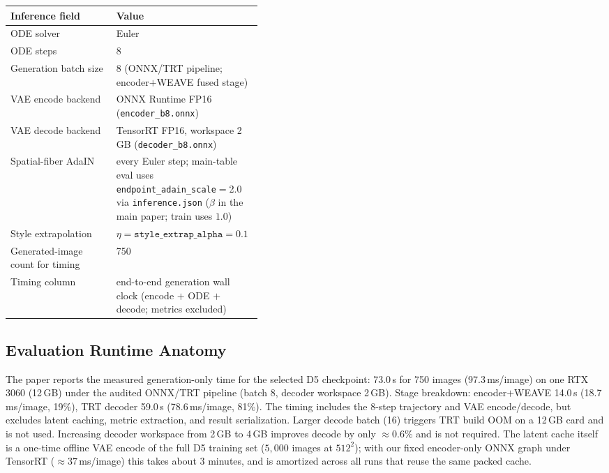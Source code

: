 \documentclass[letterpaper]{article}
\begin{document}
\begin{center}
\footnotesize
\begin{tabularx}{\linewidth}{p{0.42\linewidth}X}
\toprule
Inference field & Value \\
\midrule
ODE solver & Euler \\
ODE steps & 8 \\
Generation batch size & 8 (ONNX/TRT pipeline; encoder$+$WEAVE fused stage) \\
VAE encode backend & ONNX Runtime FP16 (\texttt{encoder\_b8.onnx}) \\
VAE decode backend & TensorRT FP16, workspace 2\,GB (\texttt{decoder\_b8.onnx}) \\
Spatial-fiber AdaIN & every Euler step; main-table eval uses \texttt{endpoint\_adain\_scale}${}={}$2.0 via \texttt{inference.json} ($\beta$ in the main paper; train uses $1.0$) \\
Style extrapolation & $\eta=\texttt{style\_extrap\_alpha}=0.1$ \\
Generated-image count for timing & 750 \\
Timing column & end-to-end generation wall clock (encode $+$ ODE $+$ decode; metrics excluded) \\
\bottomrule
\end{tabularx}
\normalsize
\end{center}

\subsection{Evaluation Runtime Anatomy}

The paper reports the measured generation-only time for the selected D5 checkpoint:
73.0\,s for 750 images (97.3\,ms/image) on one RTX 3060 (12\,GB) under the audited
ONNX/TRT pipeline (batch 8, decoder workspace 2\,GB). Stage breakdown:
encoder$+$WEAVE 14.0\,s (18.7\,ms/image, 19\%), TRT decoder 59.0\,s (78.6\,ms/image,
81\%). The timing includes the 8-step trajectory and VAE encode/decode, but excludes
latent caching, metric extraction, and result serialization. Larger decode batch (16)
triggers TRT build OOM on a 12\,GB card and is not used. Increasing decoder workspace
from 2\,GB to 4\,GB improves decode by only $\approx\!0.6\%$ and is not required.
The latent cache itself is a one-time offline VAE encode of the full D5 training set
($5{,}000$ images at $512^{2}$); with our fixed encoder-only ONNX graph under TensorRT
($\approx\!37$\,ms/image) this takes about $3$ minutes, and is amortized across all runs
that reuse the same packed cache.
\end{document}
